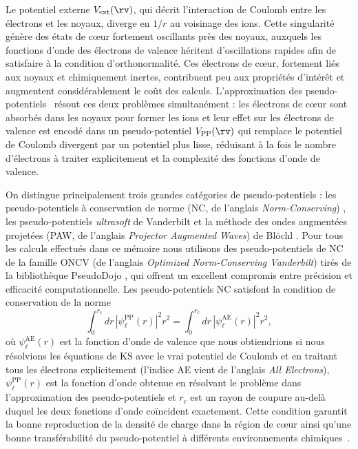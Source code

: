 Le potentiel externe $V_\text{ext}(\rv)$, qui décrit l'interaction de Coulomb entre les électrons et les noyaux, diverge en $1/r$ au voisinage des ions. Cette singularité génère des états de c\oe ur fortement oscillants près des noyaux, auxquels les fonctions d'onde des électrons de valence héritent d'oscillations rapides afin de satisfaire à la condition d'orthonormalité. Ces électrons de c\oe ur, fortement liés aux noyaux et chimiquement inertes, contribuent peu aux propriétés d'intérêt et augmentent considérablement le coût des calculs. L'approximation des pseudo-potentiels~\cite{phillipsEnergyBandInterpolationScheme1958,phillipsNewMethodCalculating1959} résout ces deux problèmes simultanément : les électrons de c\oe ur sont absorbés dans les noyaux pour former les ions et leur effet sur les électrons de valence est encodé dans un pseudo-potentiel $V_\text{PP}(\rv)$ qui remplace le potentiel de Coulomb divergent par un potentiel plus lisse, réduisant à la fois le nombre d'électrons à traiter explicitement et la complexité des fonctions d'onde de valence.

On distingue principalement trois grandes catégories de pseudo-potentiels : les pseudo-potentiels à conservation de norme (NC, de l'anglais \textit{Norm-Conserving}) \cite{hamannNormConservingPseudopotentials1979}, les pseudo-potentiels \textit{ultrasoft} de Vanderbilt \cite{vanderbiltSoftSelfconsistentPseudopotentials1990} et la méthode des ondes augmentées projetées (PAW, de l'anglais \textit{Projector Augmented Waves}) de Blöchl \cite{blochlProjectorAugmentedwaveMethod1994}. Pour tous les calculs effectués dans ce mémoire nous utilisons des pseudo-potentiels de NC de la famille ONCV (de l'anglais \textit{Optimized Norm-Conserving Vanderbilt}) tirés de la bibliothèque PseudoDojo \cite{vansettenPseudoDojoTrainingGrading2018}, qui offrent un excellent compromis entre précision et efficacité computationnelle. Les pseudo-potentiels NC satisfont la condition de conservation de la norme
\begin{equation}
    \int_0^{r_c}dr\,|\psi_\ell^\text{PP}(r)|^2r^2=\int_0^{r_c}dr\,|\psi_\ell^\text{AE}(r)|^2r^2,
    \label{eqn:c2_nc}
\end{equation}
où $\psi_\ell^\text{AE}(r)$ est la fonction d'onde de valence que nous obtiendrions si nous résolvions les équations de KS avec le vrai potentiel de Coulomb et en traitant tous les électrons explicitement (l'indice AE vient de l'anglais \textit{All Electrons}), $\psi_\ell^\text{PP}(r)$ est la fonction d'onde obtenue en résolvant le problème dans l'approximation des pseudo-potentiels et $r_c$ est un rayon de coupure au-delà duquel les deux fonctions d'onde coïncident exactement. Cette condition garantit la bonne reproduction de la densité de charge dans la région de c\oe ur ainsi qu'une bonne transférabilité du pseudo-potentiel à différents environnements chimiques~\cite{hamannGeneralizedNormconservingPseudopotentials1989,troullierEfficientPseudopotentialsPlanewave1991}.

